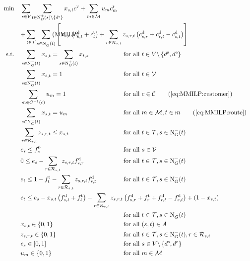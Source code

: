 \begin{align}
	\min \quad & \sum_{s\in\mathcal{V}} \sum_{t\in\Nout(s)\backslash\{d^{\operatorname{e}}\}} x_{s,t}\cv + \sum_{m\in\mathcal{M}} u_m \croute_m \nonumber \\
	& \omit\rlap{$\displaystyle{ + \sum_{t\in\mathcal{T}} \sum_{s\in\Nin(t)} \left[x_{s,t}\left(\cd_{s,t}+\ct_{t}\right) + \sum_{r\in\Rst} z_{s,r,t}\left(\cd_{s,r}+\cd_{r,t}-\cd_{s,t}\right)\right]}$} \tag{MMILP} \label{eq:MMILP} \\
	\text{s.t.} \quad & \sum_{s\in\Nin(t)} x_{s,t} = \sum_{s\in\Nout(t)} x_{t,s} & & \text{for all } t\in V\backslash\left\{d^{\operatorname{s}},d^{\operatorname{e}}\right\} \label{eq:MMILP:flow} \\
	& \sum_{s\in\Nin(t)} x_{s,t} = 1 & & \text{for all } t\in\mathcal{V} \label{eq:MMILP:vehicles} \\
	& \sum_{m\in C^{-1}(c)} u_m = 1 && \text{for all } c\in\mathcal{C} \tag{\ref{eq:MMILP:customer}} \\
	& \sum_{s\in\Nin(t)} x_{s,t} = u_m && \text{for all } m\in\mathcal{M}, t\in m \tag{\ref{eq:MMILP:route}} \\
	& \sum_{r\in\Rst} z_{s,r,t} \leq x_{s,t} & & \text{for all } t\in\mathcal{T}, s\in\Nin(t) \label{eq:MMILP:refuel} \\
	& e_s \leq f_s^0 & & \text{for all } s\in\mathcal{V} \label{eq:MMILP:initial_fuel} \\
	& 0 \leq e_s - \sum_{r\in\Rst} z_{s,r,t}\fd_{s,r} & & \text{for all } t\in\mathcal{T}, s\in\Nin(t) \label{eq:MMILP:min_fuel} \\
	& e_t \leq 1 - \ft_t - \sum_{r\in\Rst} z_{s,r,t}\fd_{r,t} & & \text{for all } t\in\mathcal{T}, s\in\Nin(t) \label{eq:MMILP:max_fuel} \\
	& \omit\rlap{$\displaystyle{e_t \leq e_s - x_{s,t}\left(f_{s,t}^{\operatorname{d}}+f_t^{\operatorname{t}}\right) - \sum_{r\in\Rst} z_{s,r,t}\left(\fd_{s,r}+\ft_r+\fd_{r,t}-\fd_{s,t}\right) + \left(1-x_{s,t}\right)}$} \nonumber \\
	& & & \text{for all } t\in\mathcal{T}, s\in\Nin(t) \label{eq:MMILP:fuel_consumption} \\
	& x_{s,t}\in\{0,1\} & & \text{for all } (s,t)\in A \label{eq:MMILP:xst} \\
	& z_{s,r,t}\in\{0,1\} & & \text{for all } t\in\mathcal{T},s\in\Nin(t),r\in\Rst \label{eq:MMILP:zsrt} \\
	& e_s\in[0,1] & & \text{for all } s\in V\backslash\left\{d^{\operatorname{s}},d^{\operatorname{e}}\right\} \label{eq:MMILP:es} \\
	& u_m\in\{0,1\} && \text{for all } m\in\mathcal{M} \label{eq:MMILP:um}
\end{align}